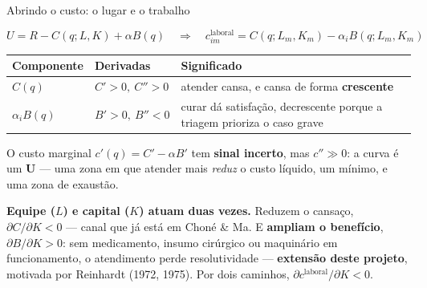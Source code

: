 \documentclass[aspectratio=169,11pt]{beamer}
\def\rastreiotexto{}
\newcommand{\rastreio}[1]{\gdef\rastreiotexto{#1}}
\newcommand{\lead}[1]{{\color{verdeEscuro}\bfseries #1}}
\renewcommand{\arraystretch}{1.18}
\begin{document}
\begin{frame}{Abrindo o custo: o lugar e o trabalho}
{    \vspace{-0.3em}
    \[ U = R - C(q; L, K) + \alpha B(q)
       \quad\Longrightarrow\quad
       c^{\text{laboral}}_{im} = C(q; L_m, K_m) - \alpha_i B(q; L_m, K_m) \]
    \vspace{-1.0em}

    {\footnotesize\renewcommand{\arraystretch}{1.2}
    \begin{tabularx}{\textwidth}{@{}>{\centering\arraybackslash}p{} >{\centering\arraybackslash}p{} L@{}}
      \toprule
      \bfseries Componente & \bfseries Derivadas & \bfseries Significado \\
      \midrule
      $C(q)$ & $C' > 0,\ C'' > 0$ & atender cansa, e cansa de forma
        \textbf{crescente} \\
      $\alpha_i B(q)$ & $B' > 0,\ B'' < 0$ & curar dá satisfação, decrescente
        porque a triagem prioriza o caso grave \\
      \bottomrule
    \end{tabularx}}

    \vspace{0.5em}
    {\footnotesize O custo marginal $c'(q) = C' - \alpha B'$ tem \textbf{sinal
    incerto}, mas $c'' \gg 0$: a curva é um \textbf{U} --- uma zona em que
    atender mais \emph{reduz} o custo líquido, um mínimo, e uma zona de
    exaustão.}

    \vspace{0.5em}
    {\footnotesize \lead{Equipe ($L$) e capital ($K$) atuam duas vezes.}
    Reduzem o cansaço, $\partial C/\partial K < 0$ --- canal que já está em
    Choné \& Ma. E \textbf{ampliam o benefício}, $\partial B/\partial K > 0$:
    sem medicamento, insumo cirúrgico ou maquinário em funcionamento, o
    atendimento perde resolutividade --- \textbf{extensão deste projeto},
    motivada por Reinhardt (1972, 1975). Por dois caminhos,
    $\partial c^{\text{laboral}}/\partial K < 0$.}
  }%
\end{frame}

\rastreio{4. Modelo microeconômico \textperiodcentered\ 1 de 2}
\end{document}
